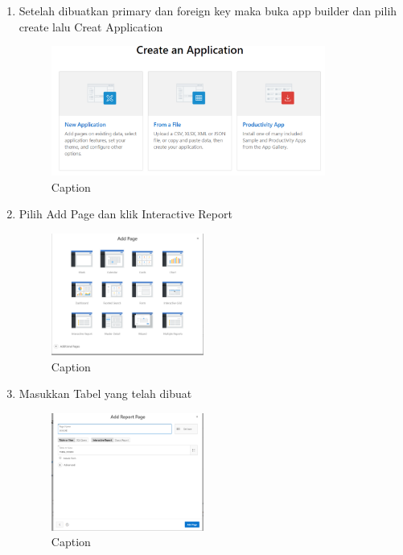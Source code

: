 \documentclass{article}
\begin{document}
\begin{enumerate}
    \item Setelah dibuatkan primary dan foreign key maka buka app builder dan pilih create lalu Creat Application
    \begin{figure}[!htbp]
        \centering
        \includegraphics [width=9cm]{figure/Capture2.PNG}
        \caption{Caption}
        \label{fig:my_label}
    \end{figure}
    
    \item Pilih Add Page dan klik Interactive Report
     \begin{figure}[!htbp]
        \centering
        \includegraphics [width=5cm]{figure/Capture21.PNG}
        \caption{Caption}
        \label{fig:my_label}
    \end{figure}
    
    \item Masukkan Tabel yang telah dibuat 
     \begin{figure}[!htbp]
        \centering
        \includegraphics [width=5cm]{figure/Capture22.PNG}
        \caption{Caption}
        \label{fig:my_label}
    \end{figure}
    

\end{enumerate}
\end{document}
